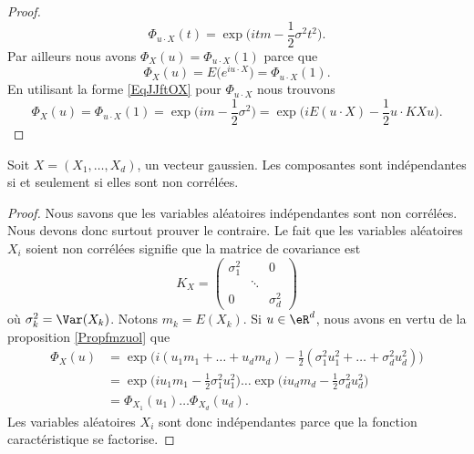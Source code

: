 \begin{proof}
    \begin{equation}    \label{EqJJftOX}
        \Phi_{u\cdot X}(t)=\exp\big( itm-\frac{ 1 }{2}\sigma^2t^2 \big).
    \end{equation}
    Par ailleurs nous avons \( \Phi_X(u)=\Phi_{u\cdot X}(1)\) parce que
    \begin{equation}
        \Phi_X(u)=E\big(  e^{iu\cdot X} \big)=\Phi_{u\cdot X}(1).
    \end{equation}
    En utilisant la forme \eqref{EqJJftOX} pour \( \Phi_{u\cdot X}\) nous trouvons
    \begin{equation}
        \Phi_X(u)=\Phi_{u\cdot X}(1)=\exp\big( im-\frac{ 1 }{2}\sigma^2 \big)=\exp\Big( iE(u\cdot X)-\frac{ 1 }{2}u\cdot KXu \Big).
    \end{equation}
\end{proof}

\begin{theorem}
    Soit \( X=(X_1,\ldots, X_d)\), un vecteur gaussien. Les composantes sont indépendantes si et seulement si elles sont non corrélées.
\end{theorem}

\begin{proof}
    Nous savons que les variables aléatoires indépendantes sont non corrélées. Nous devons donc surtout prouver le contraire. Le fait que les variables aléatoires \( X_i\) soient non corrélées signifie que la matrice de covariance est
    \begin{equation}
        K_X=\begin{pmatrix}
            \sigma_1^2    &       &   0    \\
                &   \ddots    &       \\
            0    &       &   \sigma_d^2
        \end{pmatrix}
    \end{equation}
    où \( \sigma_k^2=\Var(X_k)\). Notons \( m_k=E(X_k)\). Si \( u\in \eR^d\), nous avons en vertu de la proposition \ref{Propfmzuol} que
    \begin{subequations}
        \begin{align}
            \Phi_X(u)&=\exp\Big( i(u_1m_1+\ldots +u_dm_d)-\frac{ 1 }{2}(\sigma_1^2u_1^2+\ldots +\sigma_d^2u_d^2) \Big)\\
            &=\exp\big( iu_1m_1-\frac{ 1 }{2}\sigma_1^2u_1^2 \big)\ldots\exp\big( iu_dm_d-\frac{ 1 }{2}\sigma_d^2u_d^2 \big)\\
            &=\Phi_{X_1}(u_1)\ldots \Phi_{X_d}(u_d).
        \end{align}
    \end{subequations}
    Les variables aléatoires \( X_i\) sont donc indépendantes parce que la fonction caractéristique se factorise.
\end{proof}

